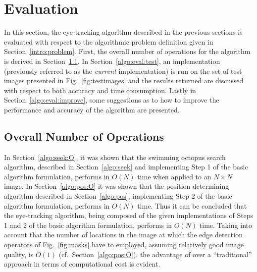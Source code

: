 
\section{Evaluation}
\label{algo:eval}

In this section, the {\octopus} eye-tracking algorithm described in
the previous sections is evaluated with respect to the algorithmic
problem definition given in Section~\ref{intro:problem}.  First, the
overall number of operations for the algorithm is derived in
Section~\ref{algo:eval:O}.  In Section~\ref{algo:eval:test}, an
implementation (previously referred to as the {\em current\/}
implementation) is run on the set of test images presented in
Fig.~\ref{fig:testimages} and the results returned are discussed with
respect to both accuracy and time consumption.  Lastly in
Section~\ref{algo:eval:improve}, some suggestions as to how to improve
the performance and accuracy of the algorithm are presented.

\subsection{Overall Number of Operations}
\label{algo:eval:O}

In Section~\ref{algo:seek:O}, it was shown that the swimming octopus
search algorithm, described in Section~\ref{algo:seek} and
implementing Step 1 of the basic algorithm formulation, performs in
$O(N)$ time when applied to an $N\times N$ image.  In
Section~\ref{algo:pos:O} it was shown that the position determining
algorithm described in Section~\ref{algo:pos}, implementing Step 2 of
the basic algorithm formulation, performs in $O(N)$ time.  Thus it can
be concluded that the {\octopus} eye-tracking algorithm, being
composed of the given implementations of Steps 1 and 2 of the basic
algorithm formulation, performs in $O(N)$ time.  Taking into account
that the number of locations in the image at which the edge detection
operators of Fig.~\ref{fig:masks} have to employed, assuming
relatively good image quality, is $O(1)$ (cf.\ 
Section~\ref{algo:pos:O}), the advantage of {\octopus} over a
``traditional'' approach in terms of computational cost is evident.

